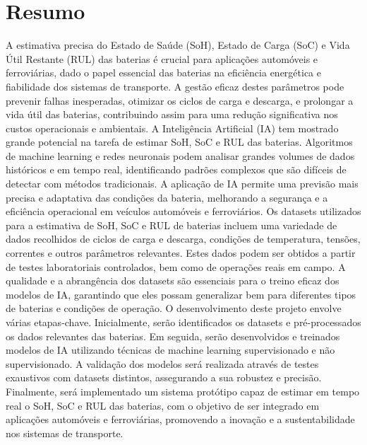 

\renewcommand{\abstractname}{Resumo}
\markboth{\spacedlowsmallcaps{\abstractname}}{\spacedlowsmallcaps{\abstractname}}
\addcontentsline{toc}{chapter}{\abstractname}


\begingroup
\let\clearpage\relax
\let\cleardoublepage\relax

\chapter*{Resumo}
\color{Red}
A estimativa precisa do Estado de Saúde (SoH), Estado de Carga (SoC) e Vida Útil Restante (RUL) das baterias é crucial para aplicações automóveis e ferroviárias, dado o papel essencial das baterias na eficiência energética e fiabilidade dos sistemas de transporte.
A gestão eficaz destes parâmetros pode prevenir falhas inesperadas, otimizar os ciclos de carga e descarga, e prolongar a vida útil das baterias, contribuindo assim para uma redução significativa nos custos operacionais e ambientais. 
A Inteligência Artificial (IA) tem mostrado grande potencial na tarefa de estimar SoH, SoC e RUL das baterias. Algoritmos de machine learning e redes neuronais podem analisar grandes volumes de dados históricos e em tempo real, identificando padrões complexos que são difíceis de detectar com métodos tradicionais. 
A aplicação de IA permite uma previsão mais precisa e adaptativa das condições da bateria, melhorando a segurança e a eficiência operacional em veículos automóveis e ferroviários. Os datasets utilizados para a estimativa de SoH, SoC e RUL de baterias incluem uma variedade de dados recolhidos de ciclos de carga e descarga, condições de temperatura, tensões, correntes e outros parâmetros relevantes. 
Estes dados podem ser obtidos a partir de testes laboratoriais controlados, bem como de operações reais em campo. A qualidade e a abrangência dos datasets são essenciais para o treino eficaz dos modelos de IA, garantindo que eles possam generalizar bem para diferentes tipos de baterias e condições de operação. O desenvolvimento deste projeto envolve várias etapas-chave. 
Inicialmente, serão identificados os datasets e pré-processados os dados relevantes das baterias. Em seguida, serão desenvolvidos e treinados modelos de IA utilizando técnicas de machine learning supervisionado e não supervisionado. A validação dos modelos será realizada através de testes exaustivos com datasets distintos, assegurando a sua robustez e precisão. 
Finalmente, será implementado um sistema protótipo capaz de estimar em tempo real o SoH, SoC e RUL das baterias, com o objetivo de ser integrado em aplicações automóveis e ferroviárias, promovendo a inovação e a sustentabilidade nos sistemas de transporte.
\color{Black}


